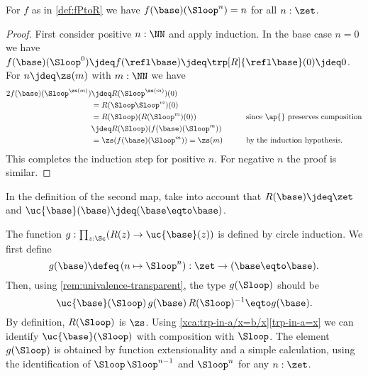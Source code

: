 \begin{lemma}\label{lem:windingnumber}
For $f$ as in \cref{def:fPtoR} we have $f(\base)(\Sloop^n)=n$ for all $n:\zet$.
\end{lemma}
\begin{proof}
First consider positive $n:\NN$ and apply induction.
In the base case $n=0$ we have
$f(\base)(\Sloop^0)\jdeq f(\refl\base)\jdeq\trp[R]{\refl\base}(0) \jdeq 0$.
For $n\jdeq\zs(m)$ with $m:\NN$ we have
\begin{alignat*}2
  f(\base)(\Sloop^{\zs(m)})&\jdeq R(\Sloop^{\zs(m)})(0)&\qquad&\\
  &= R(\Sloop \Sloop^{m})(0)&&\\
  &= R(\Sloop)(R(\Sloop^m)(0))&&\text{since $\ap{}$ preserves composition}\\
  &\jdeq R(\Sloop)(f(\base)(\Sloop^{m}))&&\\
  &= \zs(f(\base)(\Sloop^{m})) = \zs(m)&&\text{by the induction hypothesis.}
\end{alignat*}
This completes the induction step for positive $n$.
For negative $n$ the proof is similar.
\end{proof}

In the definition of the second map,
take into account that $R(\base)\jdeq \zet$ and $\uc{\base}(\base) \jdeq (\base\eqto \base)$.

\begin{definition}\label{def:gRtoP}
The function $g:\prod_{z:\Sc}(R(z)\to \uc{\base}(z))$ is
defined by circle induction. We first define
\[
g(\base)\defeq \left(n \mapsto {\Sloop^n} \right) :\zet\to(\base\eqto \base).
\]
Then, using \cref{rem:univalence-transparent}, the type $g(\Sloop)$ should be
\[
\uc{\base}(\Sloop)\, g(\base)\,R(\Sloop)^{-1}\eqto g(\base).
\]
%
By definition,
$R(\Sloop)$ is $\zs$. Using \cref{xca:trp-in-a/x=b/x}\ref{trp-in-a=x}
we can identify $\uc{\base}(\Sloop)$ with composition with $\Sloop$.
The element $g(\Sloop)$ is obtained by function extensionality and
a simple calculation, using the identification of
${\Sloop\,\Sloop^{n-1}}$ and $\Sloop^n$ for any $n:\zet$.
\end{definition}

